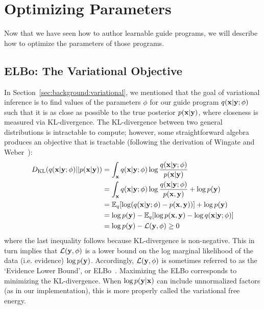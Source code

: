 \section{Optimizing Parameters}
\label{sec:optimization}

Now that we have seen how to author learnable guide programs, we will describe how to optimize the parameters of those programs. 

\subsection{ELBo: The Variational Objective}

In Section~\ref{sec:background:variational}, we mentioned that the goal of variational inference is to find values of the parameters $\phi$ for our guide program $q(\mathbf{x} | \mathbf{y} ; \phi)$ such that it is as close as possible to the true posterior $p(\mathbf{x} | \mathbf{y})$, where closeness is measured via KL-divergence. The KL-divergence between two general distributions is intractable to compute; however, some straightforward algebra produces an objective that is tractable (following the derivation of Wingate and Weber~\cite{AVIPP}):
\begin{align}
\begin{split}
D_{\text{KL}}(q(\mathbf{x} | \mathbf{y} ; \phi) || p(\mathbf{x} | \mathbf{y}))
&= \int_{\mathbf{x}} q(\mathbf{x} | \mathbf{y} ; \phi) \log \frac{q(\mathbf{x} | \mathbf{y} ; \phi)}{p(\mathbf{x} | \mathbf{y})}\\
&= \int_{\mathbf{x}} q(\mathbf{x} | \mathbf{y} ; \phi) \log \frac{q(\mathbf{x} | \mathbf{y} ; \phi)}{p(\mathbf{x}, \mathbf{y})} + \log p(\mathbf{y})\\
&= \mathbb{E}_{q}[ \log(q(\mathbf{x} | \mathbf{y} ; \phi) -  p(\mathbf{x}, \mathbf{y}) ) ] + \log p(\mathbf{y})\\
&= \log p(\mathbf{y}) - \mathbb{E}_{q}[ \log p(\mathbf{x}, \mathbf{y}) - \log q(\mathbf{x} | \mathbf{y} ; \phi) ]\\
&= \log p(\mathbf{y}) - \mathcal{L}(\mathbf{y}, \phi) \geq 0
\end{split}
\label{eq:elbo}
\end{align}
where the last inequality follows because KL-divergence is non-negative. This in turn implies that $\mathcal{L}(\mathbf{y}, \phi)$ is a lower bound on the log marginal likelihood of the data (i.e. evidence) $\log p(\mathbf{y})$. Accordingly, $\mathcal{L}(\mathbf{y}, \phi)$ is sometimes referred to as the `Evidence Lower Bound', or ELBo~\cite{BBVI}. Maximizing the ELBo corresponds to minimizing the KL-divergence.
When $\log p(\mathbf{y} | \mathbf{x})$ can include unnormalized factors (as in our implementation), this is more properly called the variational free energy.

